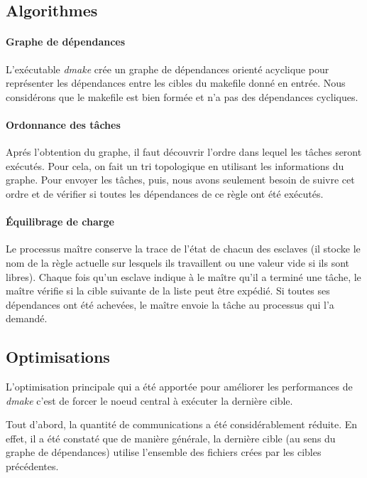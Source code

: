 \documentclass[a4paper,12pt,twoside]{article}
\begin{document}
\subsection{Algorithmes}

\paragraph{Graphe de dépendances}

L'exécutable \emph{dmake} crée un graphe de dépendances orienté
acyclique pour représenter les dépendances entre les cibles du
makefile donné en entrée. Nous considérons que le makefile est bien
formée et n'a pas des dépendances cycliques.

\paragraph{Ordonnance des tâches}

Aprés l'obtention du graphe, il faut découvrir l'ordre dans lequel
les tâches seront exécutés. Pour cela, on fait un tri
topologique en utilisant les informations du graphe. Pour envoyer les tâches, 
puis, nous avons seulement besoin de suivre cet ordre et de vérifier si toutes 
les dépendances de ce règle ont été exécutés.

\paragraph{Équilibrage de charge}

Le processus maître conserve la trace de l'état de chacun des esclaves (il stocke le nom de la règle actuelle sur lesquels ils travaillent ou une valeur vide si ils sont libres). Chaque fois qu'un esclave indique à le maître qu'il a terminé une tâche, le maître vérifie si la cible suivante de la liste peut être expédié. Si toutes ses dépendances ont été achevées, le maître envoie la tâche au processus qui l'a demandé.

\subsection{Optimisations}

L'optimisation principale qui a été apportée  pour améliorer les performances de \emph{dmake}
c'est de forcer le noeud central à exécuter la dernière cible.

Tout d'abord, la quantité de communications a été considérablement
réduite. En effet, il a été constaté que de manière générale, la
dernière cible (au sens du graphe de dépendances) utilise l'ensemble
des fichiers crées par les cibles précédentes.
\end{document}
